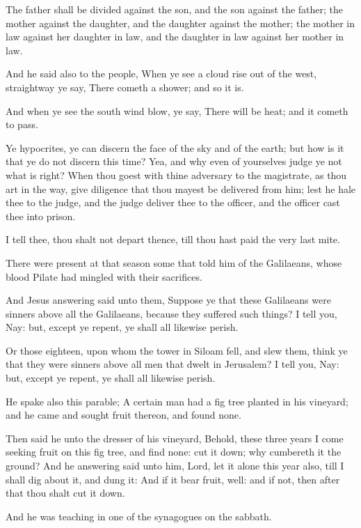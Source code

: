 \Verse The father shall be divided against the son, and the son against the father; the mother against the daughter, and the daughter against the mother; the mother in law against her daughter in law, and the daughter in law against her mother in law.

\Verse And he said also to the people, When ye see a cloud rise out of the west, straightway ye say, There cometh a shower; and so it is.

\Verse And when ye see the south wind blow, ye say, There will be heat; and it cometh to pass.

\Verse Ye hypocrites, ye can discern the face of the sky and of the earth; but how is it that ye do not discern this time?  \Verse Yea, and why even of yourselves judge ye not what is right?  \Verse When thou goest with thine adversary to the magistrate, as thou art in the way, give diligence that thou mayest be delivered from him; lest he hale thee to the judge, and the judge deliver thee to the officer, and the officer cast thee into prison.

\Verse I tell thee, thou shalt not depart thence, till thou hast paid the very last mite.


\Chapter
\Verse There were present at that season some that told him of the Galilaeans, whose blood Pilate had mingled with their sacrifices.

\Verse And Jesus answering said unto them, Suppose ye that these Galilaeans were sinners above all the Galilaeans, because they suffered such things?  \Verse I tell you, Nay: but, except ye repent, ye shall all likewise perish.

\Verse Or those eighteen, upon whom the tower in Siloam fell, and slew them, think ye that they were sinners above all men that dwelt in Jerusalem?  \Verse I tell you, Nay: but, except ye repent, ye shall all likewise perish.

\Verse He spake also this parable; A certain man had a fig tree planted in his vineyard; and he came and sought fruit thereon, and found none.

\Verse Then said he unto the dresser of his vineyard, Behold, these three years I come seeking fruit on this fig tree, and find none: cut it down; why cumbereth it the ground?  \Verse And he answering said unto him, Lord, let it alone this year also, till I shall dig about it, and dung it: \Verse And if it bear fruit, well: and if not, then after that thou shalt cut it down.

\Verse And he was teaching in one of the synagogues on the sabbath.

